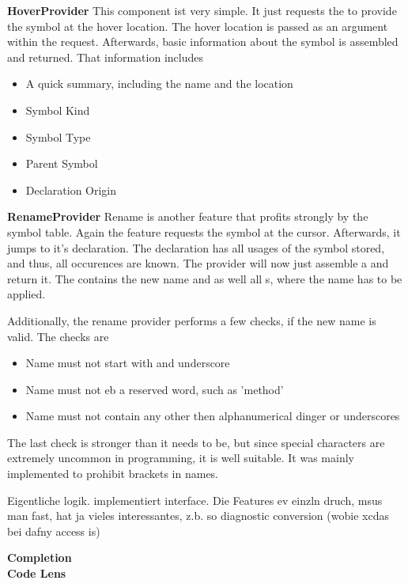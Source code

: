 \intnote{}

\textbf{HoverProvider}
This component ist very simple. It just requests the  to provide the symbol at the hover location. The hover location is passed as an argument within the request. Afterwards, basic information about the symbol is assembled and returned. That information includes \begin{itemize}
    \item A quick summary, including the name and the location
    \item Symbol Kind
    \item Symbol Type
    \item Parent Symbol
    \item Declaration Origin
\end{itemize}

\textbf{RenameProvider}
Rename is another feature that profits strongly by the symbol table. Again the feature requests the symbol at the cursor. Afterwards, it jumps to it's declaration. The declaration has all usages of the symbol stored, and thus, all occurences are known. The provider will now just assemble a  and return it. The  contains the new name and as well all s, where the name has to be applied.

Additionally, the rename provider performs a few checks, if the new name is valid. The checks are
\begin{itemize}
    \item Name must not start with and underscore
    \item Name must not eb a reserved word, such as 'method'
    \item Name must not contain any other then alphanumerical dinger or underscores
\end{itemize}

The last check is stronger than it needs to be, but since special characters are extremely uncommon in programming, it is well suitable. It was mainly implemented to prohibit brackets in names.


Eigentliche logik. implementiert interface. Die Features ev einzln druch, msus man fast, hat ja vieles interessantes, z.b. so diagnostic conversion (wobie xcdas bei dafny access is)

\textbf{Completion}\\

\textbf{Code Lens}\\

